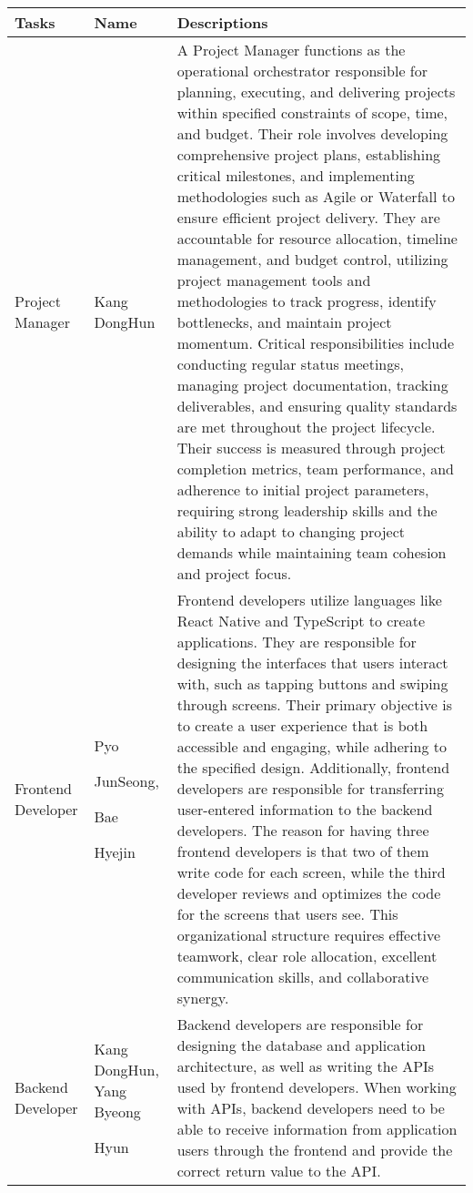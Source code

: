 \documentclass[conference]{IEEEtran}
\begin{document}
\begin{enumerate}
\begin{itemize}
\begin{itemize}
\begin{table}[h]
\begin{tabular}{|p{1.2cm}|p{1.2cm}|p{5.4cm}|}
    \hline
    Tasks & Name & Descriptions \\
    \hline
    Project Manager & Kang DongHun & A Project Manager functions as the operational orchestrator responsible for planning, executing, and delivering projects within specified constraints of scope, time, and budget. Their role involves developing comprehensive project plans, establishing critical milestones, and implementing methodologies such as Agile or Waterfall to ensure efficient project delivery. They are accountable for resource allocation, timeline management, and budget control, utilizing project management tools and methodologies to track progress, identify bottlenecks, and maintain project momentum. Critical responsibilities include conducting regular status meetings, managing project documentation, tracking deliverables, and ensuring quality standards are met throughout the project lifecycle. Their success is measured through project completion metrics, team performance, and adherence to initial project parameters, requiring strong leadership skills and the ability to adapt to changing project demands while maintaining team cohesion and project focus.  \\ 
    \hline
    Frontend Developer & Pyo \par JunSeong, \par Bae \par Hyejin & Frontend developers utilize languages like React Native and TypeScript to create applications. They are responsible for designing the interfaces that users interact with, such as tapping buttons and swiping through screens. Their primary objective is to create a user experience that is both accessible and engaging, while adhering to the specified design. Additionally, frontend developers are responsible for transferring user-entered information to the backend developers. The reason for having three frontend developers is that two of them write code for each screen, while the third developer reviews and optimizes the code for the screens that users see. This organizational structure requires effective teamwork, clear role allocation, excellent communication skills, and collaborative synergy. \\
    \hline
    Backend Developer & Kang DongHun,  Yang Byeong \par Hyun & Backend developers are responsible for designing the database and application architecture, as well as writing the APIs used by frontend developers. When working with APIs, backend developers need to be able to receive information from application users through the frontend and provide the correct return value to the API. \\
    \hline
\end{tabular}
\end{table}


\end{itemize}
\end{itemize}
\end{enumerate}
\end{document}
